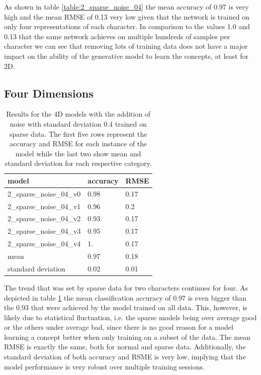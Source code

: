 As shown in table \ref{table:2_sparse_noise_04} the mean accuracy of 0.97  is very high and the mean RMSE of 0.13 very low given that the network is trained on only four representations of each character. In comparison to the values 1.0 and 0.13 that the same network achieves on multiple hundreds of samples per character we can see that removing lots of training data does not have a major impact on the ability of the generative model to learn the concepts, at least for 2D.

\subsection{Four Dimensions}

\begin{table}[!htb]
	\centering
	\caption{Results for the 4D models with the addition of noise with standard deviation 0.4 trained on sparse data. The first five rows represent the accuracy and RMSE for each instance of the model while the last two show mean and standard deviation for each respective category.}
	\begin{tabularx}{\textwidth}{ X  X  X }
		\hline
		model & accuracy & RMSE \\ 
		\hline
		2\_sparse\_noise\_04\_v0 & 0.98 & 0.17 \\ 
		2\_sparse\_noise\_04\_v1 & 0.96 & 0.2  \\
		2\_sparse\_noise\_04\_v2 & 0.93 & 0.17\\ 
		2\_sparse\_noise\_04\_v3 & 0.95 & 0.17\\ 
		2\_sparse\_noise\_04\_v4 & 1.  & 0.17 \\ \hline
		mean & 0.97 & 0.18\\
		standard deviation & 0.02 & 0.01\\
		\hline
	\end{tabularx}
	\label{table:4_sparse_noise_04}
\end{table}

The trend that was set by sparse data for two characters continues for four. As depicted in table \ref{table:4_sparse_noise_04} the mean classification accuracy of 0.97 is even bigger than the 0.93 that were achieved by the model trained on all data. This, however, is likely due to statistical fluctuation, i.e. the sparse models being over average good or the others under average bad, since there is no good reason for a model learning a concept better when only training on a subset of the data. The mean RMSE is exactly the same, both for normal and sparse data. Additionally, the standard deviation of both accuracy and RSME is very low, implying that the model performance is very robust over multiple training sessions.

